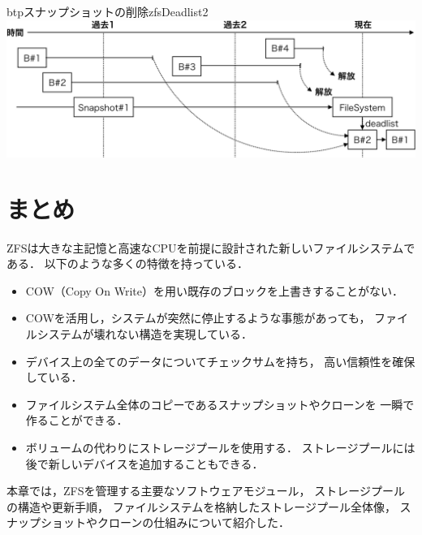 \begin{myfig}{btp}{スナップショットの削除}{zfsDeadlist2}
  \centering\includegraphics[scale=0.7]{Fig/zfsDeadlist2-crop.pdf}
\end{myfig}


\section{まとめ}
ZFSは大きな主記憶と高速なCPUを前提に設計された新しいファイルシステムである．
以下のような多くの特徴を持っている．
\begin{itemize}
\item COW（Copy On Write）を用い既存のブロックを上書きすることがない．
\item COWを活用し，システムが突然に停止するような事態があっても，
  ファイルシステムが壊れない構造を実現している．
\item デバイス上の全てのデータについてチェックサムを持ち，
  高い信頼性を確保している．
\item ファイルシステム全体のコピーであるスナップショットやクローンを
  一瞬で作ることができる．
\item ボリュームの代わりにストレージプールを使用する．
  ストレージプールには後で新しいデバイスを追加することもできる．
\end{itemize}

本章では，ZFSを管理する主要なソフトウェアモジュール，
ストレージプールの構造や更新手順，
ファイルシステムを格納したストレージプール全体像，
スナップショットやクローンの仕組みについて紹介した．

